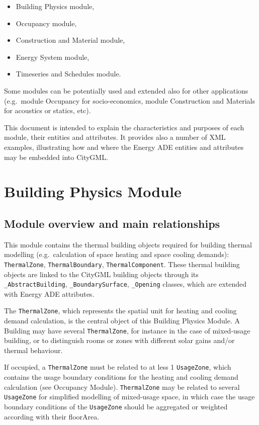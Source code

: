 \documentclass[a4paper,12pt]{article}
\providecommand{\tightlist}{%
  \setlength{\itemsep}{0pt}\setlength{\parskip}{0pt}}
\let\stdsection\section%
\renewcommand\section{\newpage\stdsection}
\begin{document}
\begin{itemize}
\tightlist
\item
  Building Physics module,
\item
  Occupancy module,
\item
  Construction and Material module,
\item
  Energy System module,
\item
  Timeseries and Schedules module.
\end{itemize}

Some modules can be potentially used and extended also for other
applications (e.g.~module Occupancy for socio-economics, module
Construction and Materials for acoustics or statics, etc).

This document is intended to explain the characteristics and purposes of
each module, their entities and attributes. It provides also a number of
XML examples, illustrating how and where the Energy ADE entities and
attributes may be embedded into CityGML.

\section{Building Physics Module}\label{building-physics-module}

\subsection{Module overview and main
relationships}\label{module-overview-and-main-relationships}

This module contains the thermal building objects required for building
thermal modelling (e.g.~calculation of space heating and space cooling
demands): \texttt{ThermalZone}, \texttt{ThermalBoundary},
\texttt{ThermalComponent}. These thermal building objects are linked to
the CityGML building objects through its \texttt{\_AbstractBuilding},
\texttt{\_BoundarySurface}, \texttt{\_Opening} classes, which are
extended with Energy ADE attributes.

The \texttt{ThermalZone}, which represents the spatial unit for heating
and cooling demand calculation, is the central object of this Building
Physics Module. A Building may have several \texttt{ThermalZone}, for
instance in the case of mixed-usage building, or to distinguish rooms or
zones with different solar gains and/or thermal behaviour.

If occupied, a \texttt{ThermalZone} must be related to at less 1
\texttt{UsageZone}, which contains the usage boundary conditions for the
heating and cooling demand calculation (see Occupancy Module).
\texttt{ThermalZone} may be related to several \texttt{UsageZone} for
simplified modelling of mixed-usage space, in which case the usage
boundary conditions of the \texttt{UsageZone} should be aggregated or
weighted according with their floorArea.
\end{document}
